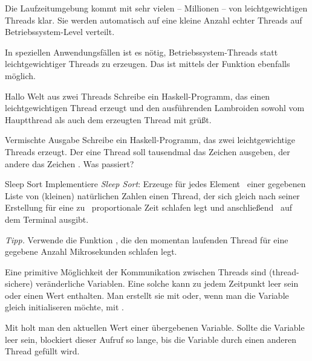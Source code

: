 \documentclass{uebblatt}
\begin{document}
Die Laufzeitumgebung kommt mit sehr vielen -- Millionen -- von
leichtgewichtigen Threads klar. Sie werden automatisch auf eine kleine Anzahl
echter Threads auf Betriebssystem-Level verteilt.

In speziellen Anwendungsfällen ist es nötig, Betriebssystem-Threads statt
leichtgewichtiger Threads zu erzeugen. Das ist mittels der Funktion
 ebenfalls möglich.

\begin{aufgabe}{Hallo Welt aus zwei Threads}
Schreibe ein Haskell-Programm, das einen leichtgewichtigen Thread erzeugt
und den ausführenden Lambroiden sowohl vom Hauptthread als auch dem erzeugten
Thread mit  grüßt.
\end{aufgabe}

\begin{aufgabe}{Vermischte Ausgabe}
Schreibe ein Haskell-Programm, das zwei leichtgewichtige Threads erzeugt. Der
eine Thread soll tausendmal das Zeichen  ausgeben, der
andere das Zeichen . Was passiert?
\end{aufgabe}

\begin{aufgabe}{Sleep Sort}
Implementiere \emph{Sleep Sort}: Erzeuge für jedes
Element~ einer gegebenen Liste von (kleinen) natürlichen
Zahlen einen Thread, der sich gleich nach seiner Erstellung für eine
zu~ proportionale Zeit schlafen legt und
anschließend~ auf dem Terminal ausgibt.

{\scriptsize\emph{Tipp.} Verwende die Funktion , die den momentan laufenden Thread für eine gegebene Anzahl
Mikrosekunden schlafen legt.\par}
\end{aufgabe}

Eine primitive Möglichkeit der Kommunikation zwischen Threads sind
(thread-sichere) veränderliche Variablen. Eine solche kann zu jedem Zeitpunkt
leer sein oder einen Wert enthalten. Man erstellt sie mit
 oder, wenn man die Variable gleich
initialiseren möchte, mit .

Mit  holt man den aktuellen Wert
einer übergebenen Variable. Sollte die Variable leer sein, blockiert dieser
Aufruf so lange, bis die Variable durch einen anderen Thread gefüllt wird.
\end{document}
